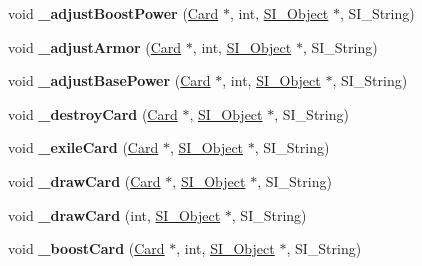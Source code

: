 \begin{DoxyCompactItemize}
\item 
\mbox{\label{class_field_a321a7886a7a9447f7a2c6b6ec8424cbc}} 
void {\bfseries \+\_\+adjust\+Boost\+Power} (\hyperlink{class_card}{Card} $\ast$, int, \hyperlink{class_s_i___object}{S\+I\+\_\+\+Object} $\ast$, S\+I\+\_\+\+String)
\item 
\mbox{\label{class_field_acfe9521506e20a022347b5f9659a9c5d}} 
void {\bfseries \+\_\+adjust\+Armor} (\hyperlink{class_card}{Card} $\ast$, int, \hyperlink{class_s_i___object}{S\+I\+\_\+\+Object} $\ast$, S\+I\+\_\+\+String)
\item 
\mbox{\label{class_field_a15a7f6b26c5f015aa28f3a144e0dad9b}} 
void {\bfseries \+\_\+adjust\+Base\+Power} (\hyperlink{class_card}{Card} $\ast$, int, \hyperlink{class_s_i___object}{S\+I\+\_\+\+Object} $\ast$, S\+I\+\_\+\+String)
\item 
\mbox{\label{class_field_a713346d3faad600750e4870a6dfe7d7f}} 
void {\bfseries \+\_\+destroy\+Card} (\hyperlink{class_card}{Card} $\ast$, \hyperlink{class_s_i___object}{S\+I\+\_\+\+Object} $\ast$, S\+I\+\_\+\+String)
\item 
\mbox{\label{class_field_a3ee5ec169c1d3abb1f597f7f2c6421e1}} 
void {\bfseries \+\_\+exile\+Card} (\hyperlink{class_card}{Card} $\ast$, \hyperlink{class_s_i___object}{S\+I\+\_\+\+Object} $\ast$, S\+I\+\_\+\+String)
\item 
\mbox{\label{class_field_aa20b0f1a6e9ec0c89164f2fe2b8715ef}} 
void {\bfseries \+\_\+draw\+Card} (\hyperlink{class_card}{Card} $\ast$, \hyperlink{class_s_i___object}{S\+I\+\_\+\+Object} $\ast$, S\+I\+\_\+\+String)
\item 
\mbox{\label{class_field_a3eb6669f724d3e1b2376bb72fa769dd2}} 
void {\bfseries \+\_\+draw\+Card} (int, \hyperlink{class_s_i___object}{S\+I\+\_\+\+Object} $\ast$, S\+I\+\_\+\+String)
\item 
\mbox{\label{class_field_a7a538ad52f1b474c17592106641ce573}} 
void {\bfseries \+\_\+boost\+Card} (\hyperlink{class_card}{Card} $\ast$, int, \hyperlink{class_s_i___object}{S\+I\+\_\+\+Object} $\ast$, S\+I\+\_\+\+String)
\item 

\end{DoxyCompactItemize}
